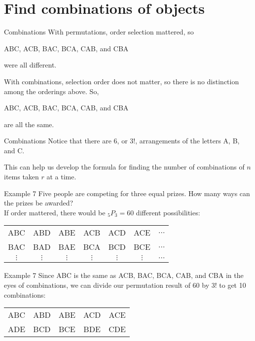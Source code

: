 \documentclass[t]{beamer}
\begin{document}
\section{Find combinations of objects}

\begin{frame}{Combinations}
With permutations, order selection mattered, so 
\begin{center}
ABC, ACB, BAC, BCA, CAB, and CBA
\end{center}
were all different.	\newline\\	\pause

With combinations, selection order does not matter, so there is no distinction among the orderings above. So,
\begin{center}
ABC, ACB, BAC, BCA, CAB, and CBA
\end{center}
are all the same.
\end{frame}

\begin{frame}{Combinations}
Notice that there are 6, or $3!$, arrangements of the letters A, B, and C. \newline\\	\pause

This can help us develop the formula for finding the number of combinations of $n$ items taken $r$ at a time.
\end{frame}

\begin{frame}{Example 7}
Five people are competing for three equal prizes. How many ways can the prizes be awarded?	\newline\\

If order mattered, there would be $_5P_3 = 60$ different possibilities:
\begin{center}
\begin{tabular}{ccccccc}
ABC & ABD & ABE & ACB & ACD & ACE & $\dots$ \\
BAC & BAD & BAE & BCA & BCD & BCE & $\dots$ \\
$\vdots$ & $\vdots$ & $\vdots$ & $\vdots$ & $\vdots$ & $\vdots$ & $\dots$ 
\end{tabular}
\end{center}
\end{frame}

\begin{frame}{Example 7}
Since ABC is the same as ACB, BAC, BCA, CAB, and CBA in the eyes of combinations, we can divide our permutation result of 60 by 3! to get \alert{10 combinations}:

\begin{center}
\begin{tabular}{ccccc}
ABC & ABD & ABE & ACD & ACE \\
ADE & BCD & BCE & BDE & CDE \\
\end{tabular}
\end{center}
\end{frame}
\end{document}
